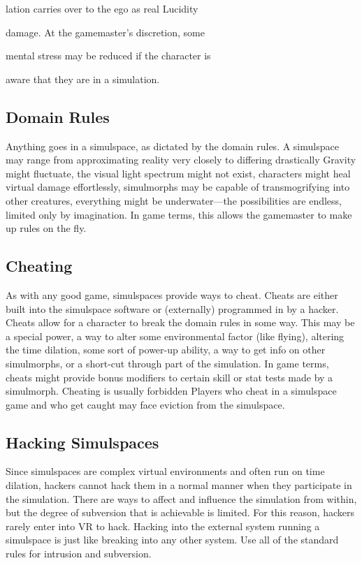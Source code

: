 lation carries over to the ego as real Lucidity 

damage. At the gamemaster's discretion, some 

mental stress may be reduced if the character is 

aware that they are in a simulation.

\subsection{Domain Rules}

Anything goes in a simulspace, as dictated by 
the domain rules. A simulspace may range from 
approximating reality very closely to differing drastically
Gravity might fluctuate, the visual light spectrum
might not exist, characters might heal virtual
damage effortlessly, simulmorphs may be capable of 
transmogrifying into other creatures, everything might 
be underwater—the possibilities are endless, limited 
only by imagination. In game terms, this allows the 
gamemaster to make up rules on the fly.

\subsection{Cheating}

As with any good game, simulspaces provide ways 
to cheat. Cheats are either built into the simulspace 
software or (externally) programmed in by a hacker. 
Cheats allow for a character to break the domain rules 
in some way. This may be a special power, a way to 
alter some environmental factor (like flying), altering 
the time dilation, some sort of power-up ability, a 
way to get info on other simulmorphs, or a short-cut 
through part of the simulation. In game terms, cheats 
might provide bonus modifiers to certain skill or stat 
tests made by a simulmorph. Cheating is usually forbidden
Players who cheat in a simulspace game and
who get caught may face eviction from the simulspace.

\subsection{Hacking Simulspaces}

Since simulspaces are complex virtual environments 
and often run on time dilation, hackers cannot hack 
them in a normal manner when they participate in the 
simulation. There are ways to affect and influence the 
simulation from within, but the degree of subversion 
that is achievable is limited. For this reason, hackers 
rarely enter into VR to hack. Hacking into the external
system running a simulspace is just like breaking
into any other system. Use all of the standard rules for 
intrusion and subversion.

